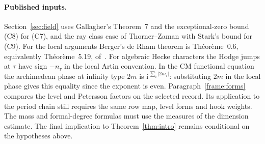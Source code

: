 \paragraph{Published inputs.}\label{fr:sec:audit}
Section~\ref{sec:field} uses Gallagher's Theorem~7 and the exceptional-zero
bound (C8) for (C7), and the ray class case of Thorner--Zaman with Stark's
bound for (C9). For the local arguments Berger's de Rham theorem is
Th\'eor\`eme~0.6, equivalently Th\'eor\`eme~5.19, of~\cite{berger02}.
For algebraic Hecke characters the Hodge jumps at $\tau$ have sign
$-n_\tau$ in the local Artin convention. In the CM functional equation
the archimedean phase at infinity type $2m$ is
$\mathrm{i}^{\,\sum_i|2m_i|}$: substituting $2m$ in the local phase gives
this equality since the exponent is even.
Paragraph~\ref{frame:forms} compares the level and Petersson factors
on the selected record. Its application to the period chain still
requires the same row map, level forms and hook weights.
The mass and formal-degree formulas must use the measures of the
dimension estimate. The final implication to Theorem~\ref{thm:intro}
remains conditional on the hypotheses above.


